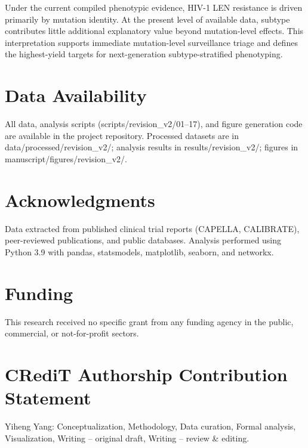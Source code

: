 \documentclass[preprint]{elsarticle}
\begin{document}
Under the current compiled phenotypic evidence, HIV-1 LEN resistance is driven primarily by mutation identity. At the present level of available data, subtype contributes little additional explanatory value beyond mutation-level effects. This interpretation supports immediate mutation-level surveillance triage and defines the highest-yield targets for next-generation subtype-stratified phenotyping.

\section*{Data Availability}
All data, analysis scripts (scripts/revision\_v2/01--17), and figure generation code are available in the project repository. Processed datasets are in data/processed/revision\_v2/; analysis results in results/revision\_v2/; figures in manuscript/figures/revision\_v2/.

\section*{Acknowledgments}
Data extracted from published clinical trial reports (CAPELLA, CALIBRATE), peer-reviewed publications, and public databases. Analysis performed using Python 3.9 with pandas, statsmodels, matplotlib, seaborn, and networkx.

\section*{Funding}
This research received no specific grant from any funding agency in the public, commercial, or not-for-profit sectors.

\section*{CRediT Authorship Contribution Statement}
Yiheng Yang: Conceptualization, Methodology, Data curation, Formal analysis, Visualization, Writing -- original draft, Writing -- review \& editing.
\end{document}
